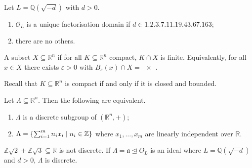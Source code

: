 \begin{theorem}
    Let \( L = \mathbb Q(\sqrt{-d}) \) with \( d > 0 \).
    \begin{enumerate}
        \item \( \mathcal O_L \) is a unique factorisation domain if \( d \in \qty{1, 2, 3, 7, 11, 19, 43, 67, 163} \);
        \item there are no others.
    \end{enumerate}
\end{theorem}
\begin{definition}
    A subset \( X \subseteq \mathbb R^n \) if for all \( K \subseteq \mathbb R^n \) compact, \( K \cap X \) is finite.
    Equivalently, for all \( x \in X \) there exists \( \varepsilon > 0 \) with \( B_\varepsilon(x) \cap X = \qty{x} \).
\end{definition}
Recall that \( K \subseteq \mathbb R^n \) is compact if and only if it is closed and bounded.
\begin{proposition}
    Let \( \Lambda \subseteq \mathbb R^n \).
    Then the following are equivalent.
    \begin{enumerate}
        \item \( \Lambda \) is a discrete subgroup of \( (\mathbb R^n, +) \);
        \item \( \Lambda = \qty{\sum_{i=1}^m n_i x_i \mid n_i \in \mathbb Z} \) where \( x_1, \dots, x_m \) are linearly independent over \( \mathbb R \).
    \end{enumerate}
\end{proposition}
\begin{example}
    \( \mathbb Z\sqrt{2} + \mathbb Z\sqrt{3} \subseteq \mathbb R \) is not discrete.
    If \( \Lambda = \mathfrak a \trianglelefteq O_L \) is an ideal where \( L = \mathbb Q(\sqrt{-d}) \) and \( d > 0 \), \( \Lambda \) is discrete.
\end{example}
